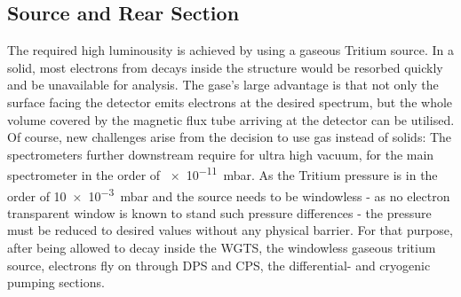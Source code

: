       \subsection{Source and Rear Section}
      \label{ch:The KATRIN experiment:sec:Experimental setup:subsec:sourceSide}
      The required high luminousity is achieved by using a gaseous Tritium source. In a solid, most electrons from decays inside the structure would be resorbed quickly and be unavailable for analysis. The gase's large advantage is that not only the surface facing the detector emits electrons at the desired spectrum, but the whole volume covered by the magnetic flux tube arriving at the detector can be utilised. Of course, new challenges arise from the decision to use gas instead of solids: The spectrometers further downstream require for ultra high vacuum, for the main spectrometer in the order of \SI{e-11}{\milli\bar}. As the Tritium pressure is in the order of \SI{10e-3}{\milli\bar} and the source needs to be windowless - as no electron transparent window is known to stand such pressure differences - the pressure must be reduced to desired values without any physical barrier. 
      For that purpose, after being allowed to decay inside the WGTS, the windowless gaseous tritium source, electrons fly on through DPS and CPS, the differential- and cryogenic pumping sections. 
      
